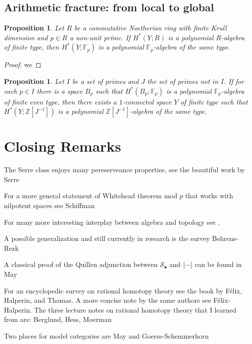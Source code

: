 \documentclass[psamsfonts]{amsart}
\newtheorem{prop}[thm]{Proposition}
\theoremstyle{definition}
\theoremstyle{remark}
\newcommand{\Z}{\mathbb{Z}}
\newcommand{\F}{\mathbb{F}}
\numberwithin{equation}{section}
\begin{document}
\subsection{Arithmetic fracture: from local to global}

\begin{prop}
Let $R$ be a commutative Noetherian ring with finite Krull dimension and $p\in R$ a non-unit prime. If $H^\ast(Y;R)$ is a polynomial $R$-algebra of finite type, then $H^\ast(Y;\F_p)$ is a polynomial $\F_p$-algebra of the same type.
\end{prop}
\begin{proof}
we
\end{proof}

\begin{prop}
Let $I$ be a set of primes and $J$ the set of primes not in $I$. If for each $p\in I$ there is a space $B_p$ such that $H^\ast(B_p;\F_p)$ is a polynomial $\F_p$-algebra of finite even type, then there exists a $1$-connected space $Y$ of finite type such that $H^\ast(Y;\Z[J^{-1}])$ is a polynomial $\Z[J^{-1}]$-algebra of the same type.
\end{prop}

\newpage
\section{Closing Remarks}

The Serre class enjoys many pereserveance properties, see the beautiful work by Serre\cite{Serre}

For a more general statement of Whitehead theorem mod $p$ that works with nilpotent spaces see Schiffman\cite{Schiffman}

For many more interesting interplay between algebra and topology see \cite{Avramov}.

A possible generalization and still currently in research is the survey Behrens-Rezk \cite{Behrens-Rezk}

A classical proof of the Quillen adjunction between $\mathcal{S}_\bullet$ and $\abs{-}$ can be found in May\cite{May2}

For an encyclopedic survey on rational homotopy theory see the book by Félix, Halperin, and Thomas\cite{Felix}. A more concise note by the same authors see Félix-Halperin\cite{Felix-Halperin}. The three lecture notes on rational homotopy theory that I learned from are: Berglund\cite{Berglund}, Hess\cite{Hess}, Moerman\cite{Moerman}

Two places for model categories are May\cite{May} and Goerss-Schemmerhorn\cite{Goerss-Schemmerhorn}
\end{document}
